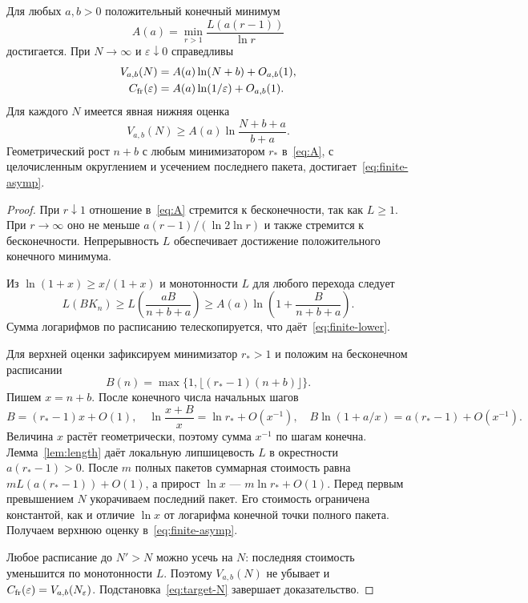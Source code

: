 \begin{theorem}
\label{thm:optimal}
Для любых $a,b>0$ положительный конечный минимум
\begin{equation}
 A(a)=\min_{r>1}\frac{L(a(r-1))}{\ln r}
 \label{eq:A}
\end{equation}
достигается. При $N\to\infty$ и $\varepsilon\downarrow0$ справедливы
\begin{align}
 V_{a,b}(N)&=A(a)\ln(N+b)+O_{a,b}(1),
 \label{eq:finite-asymp}\\
 C_{\rm fr}(\varepsilon)&=A(a)\ln(1/\varepsilon)+O_{a,b}(1).
 \label{eq:eps-asymp}
\end{align}
Для каждого $N$ имеется явная нижняя оценка
\begin{equation}
 V_{a,b}(N)\ge
 A(a)\ln\frac{N+b+a}{b+a}.
 \label{eq:finite-lower}
\end{equation}
Геометрический рост $n+b$ с любым минимизатором $r_*$
в~\eqref{eq:A}, с целочисленным округлением и усечением последнего пакета,
достигает~\eqref{eq:finite-asymp}.
\end{theorem}
\begin{proof}
При $r\downarrow1$ отношение в~\eqref{eq:A} стремится к бесконечности, так как
$L\ge1$. При $r\to\infty$ оно не меньше
$a(r-1)/(\ln2\ln r)$ и также стремится к бесконечности. Непрерывность $L$
обеспечивает достижение положительного конечного минимума.

Из $\ln(1+x)\ge x/(1+x)$ и монотонности $L$ для любого перехода следует
\[
 L(BK_n)\ge L\left(\frac{aB}{n+b+a}\right)
 \ge A(a)\ln\left(1+\frac{B}{n+b+a}\right).
\]
Сумма логарифмов по расписанию телескопируется, что
даёт~\eqref{eq:finite-lower}.

Для верхней оценки зафиксируем минимизатор $r_*>1$ и положим на бесконечном
расписании
\[
 B(n)=\max\{1,\lfloor(r_*-1)(n+b)\rfloor\}.
\]
Пишем $x=n+b$. После конечного числа начальных шагов
\[
 B=(r_*-1)x+O(1),\quad
 \ln\frac{x+B}{x}=\ln r_*+O(x^{-1}),\quad
 B\ln(1+a/x)=a(r_*-1)+O(x^{-1}).
\]
Величина $x$ растёт геометрически, поэтому сумма $x^{-1}$ по шагам конечна.
Лемма~\ref{lem:length} даёт локальную липшицевость $L$ в окрестности
$a(r_*-1)>0$. После $m$ полных пакетов суммарная стоимость равна
$mL(a(r_*-1))+O(1)$, а прирост $\ln x$ --- $m\ln r_*+O(1)$.
Перед первым превышением $N$ укорачиваем последний пакет. Его стоимость
ограничена константой, как и отличие $\ln x$ от логарифма конечной точки
полного пакета. Получаем верхнюю оценку в~\eqref{eq:finite-asymp}.

Любое расписание до $N'>N$ можно усечь на $N$: последняя стоимость уменьшится
по монотонности $L$. Поэтому $V_{a,b}(N)$ не убывает и
$C_{\rm fr}(\varepsilon)=V_{a,b}(N_\varepsilon)$.
Подстановка~\eqref{eq:target-N} завершает доказательство.
\end{proof}

